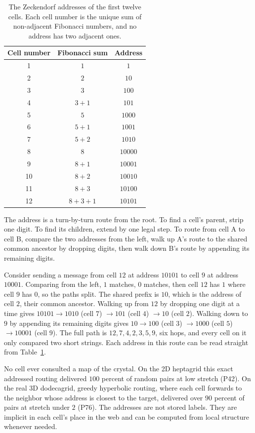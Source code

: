 \begin{table}[h]
\centering
\begin{tabular}{ccc}
\toprule
Cell number & Fibonacci sum & Address \\
\midrule
1  & $1$         & $1$     \\
2  & $2$         & $10$    \\
3  & $3$         & $100$   \\
4  & $3 + 1$     & $101$   \\
5  & $5$         & $1000$  \\
6  & $5 + 1$     & $1001$  \\
7  & $5 + 2$     & $1010$  \\
8  & $8$         & $10000$ \\
9  & $8 + 1$     & $10001$ \\
10 & $8 + 2$     & $10010$ \\
11 & $8 + 3$     & $10100$ \\
12 & $8 + 3 + 1$ & $10101$ \\
\bottomrule
\end{tabular}
\caption{The Zeckendorf addresses of the first twelve cells. Each cell number is the unique sum of non-adjacent
Fibonacci numbers, and no address has two adjacent ones.}
\label{tab:zeckendorf}
\end{table}

The address is a turn-by-turn route from the root. To find a cell's parent, strip one digit. To find its
children, extend by one legal step. To route from cell A to cell B, compare the two addresses from the left,
walk up A's route to the shared common ancestor by dropping digits, then walk down B's route by appending its
remaining digits.

Consider sending a message from cell $12$ at address $10101$ to cell $9$ at address
$10001$. Comparing from the left, $1$ matches, $0$ matches, then cell $12$ has $1$ where cell $9$ has $0$, so
the paths split. The shared prefix is $10$, which is the address of cell $2$, their common ancestor. Walking
up from $12$ by dropping one digit at a time gives $10101 \to 1010$ (cell $7$) $\to 101$ (cell $4$) $\to 10$
(cell $2$). Walking down to $9$ by appending its remaining digits gives $10 \to 100$ (cell $3$) $\to 1000$
(cell $5$) $\to 10001$ (cell $9$). The full path is $12, 7, 4, 2, 3, 5, 9$, six hops, and every cell on it
only compared two short strings. Each address in this route can be read straight from Table~\ref{tab:zeckendorf}.

No cell ever consulted a map of the crystal. On the 2D heptagrid this exact
addressed routing delivered $100$ percent of random pairs at low stretch (P42). On the real 3D dodecagrid,
greedy hyperbolic routing, where each cell forwards to the neighbor whose address is closest to the target,
delivered over $90$ percent of pairs at stretch under $2$ (P76). The addresses are not stored labels. They
are implicit in each cell's place in the web and can be computed from local structure whenever needed.

